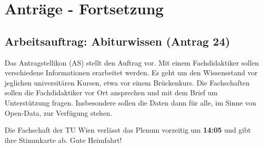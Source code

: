 \section{Anträge - Fortsetzung}
  \subsection*{Arbeitsauftrag: Abiturwissen (Antrag 24)}
    Das Antragstellikon (AS) stellt den Auftrag vor.
    Mit einem Fachdidaktiker sollen verschiedene Informationen erarbeitet werden.
    Es geht um den Wissensstand vor jeglichen universitären Kursen, etwa vor einem Brückenkurs.
    Die Fachschaften sollen die Fachdidaktiker vor Ort ansprechen und mit dem Brief um Unterstützung fragen.
    Insbesondere sollen die Daten dann für alle, im Sinne von Open-Data, zur Verfügung stehen.

    \begin{info}{}
      Die Fachschaft der TU Wien verlässt das Plenum vorzeitig um \textbf{14:05} und gibt ihre Stimmkarte ab. Gute Heimfahrt!
    \end{info}

